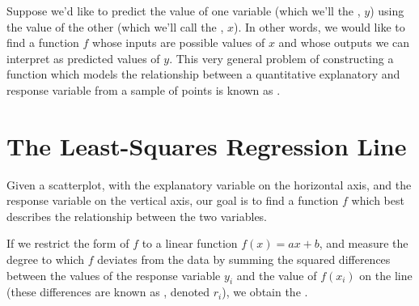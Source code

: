 Suppose we'd like to predict the value of one variable (which we'll the , $y$) using the value of the other (which we'll call the , $x$). In other words, we would like to find a function $f$ whose inputs are possible values of $x$ and whose outputs we can interpret as predicted values of $y$. This very general problem of constructing a function which models the relationship between a quantitative explanatory and response variable from a sample of points is known as . %

\section{The Least-Squares Regression Line}

Given a scatterplot, with the explanatory variable on the horizontal axis, and the response variable on the vertical axis, our goal is to find a function $f$ which best describes the relationship between the two variables. 

If we restrict the form of $f$ to a linear function $f(x) = ax+b$, and measure the degree to which $f$ deviates from the data by summing the squared differences between the values of the response variable $y_i$ and the value of $f(x_i)$ on the line (these differences are known as , denoted $r_i$), we obtain the .


